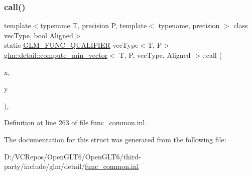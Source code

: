 \subsubsection{\texorpdfstring{call()}{call()}}
{\footnotesize\ttfamily template$<$typename T, precision P, template$<$ typename, precision $>$ class vec\+Type, bool Aligned$>$ \\
static \mbox{\hyperlink{setup_8hpp_a33fdea6f91c5f834105f7415e2a64407}{G\+L\+M\+\_\+\+F\+U\+N\+C\+\_\+\+Q\+U\+A\+L\+I\+F\+I\+ER}} vec\+Type$<$T, P$>$ \mbox{\hyperlink{structglm_1_1detail_1_1compute__min__vector}{glm\+::detail\+::compute\+\_\+min\+\_\+vector}}$<$ T, P, vec\+Type, Aligned $>$\+::call (\begin{DoxyParamCaption}\item[{vec\+Type$<$ T, P $>$ const \&}]{x,  }\item[{vec\+Type$<$ T, P $>$ const \&}]{y }\end{DoxyParamCaption})\hspace{0.3cm}{\ttfamily [inline]}, {\ttfamily [static]}}



Definition at line 263 of file func\+\_\+common.\+inl.



The documentation for this struct was generated from the following file\+:\begin{DoxyCompactItemize}
\item 
D\+:/\+V\+C\+Repos/\+Open\+G\+L\+T6/\+Open\+G\+L\+T6/third-\/party/include/glm/detail/\mbox{\hyperlink{func__common_8inl}{func\+\_\+common.\+inl}}\end{DoxyCompactItemize}
